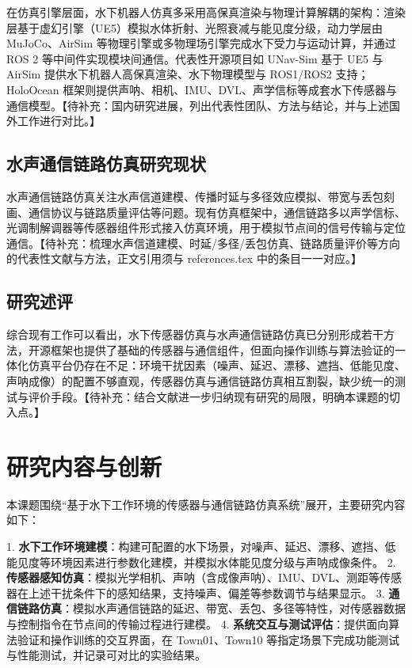 在仿真引擎层面，水下机器人仿真多采用高保真渲染与物理计算解耦的架构：渲染层基于虚幻引擎（UE5）模拟水体折射、光照衰减与能见度分级，动力学层由 MuJoCo、AirSim 等物理引擎或多物理场引擎完成水下受力与运动计算，并通过 ROS 2 等中间件实现模块间通信。代表性开源项目如 UNav-Sim 基于 UE5 与 AirSim 提供水下机器人高保真渲染、水下物理模型与 ROS1/ROS2 支持；HoloOcean 框架则提供声呐、相机、IMU、DVL、声学信标等成套水下传感器与通信模型\cite{ref3}。【待补充：国内研究进展，列出代表性团队、方法与结论，并与上述国外工作进行对比。】

\subsection{水声通信链路仿真研究现状}

水声通信链路仿真关注水声信道建模、传播时延与多径效应模拟、带宽与丢包刻画、通信协议与链路质量评估等问题。现有仿真框架中，通信链路多以声学信标、光调制解调器等传感器组件形式接入仿真环境，用于模拟节点间的信号传输与定位通信\cite{ref2}。【待补充：梳理水声信道建模、时延/多径/丢包仿真、链路质量评价等方向的代表性文献与方法，正文引用须与 references.tex 中的条目一一对应。】

\subsection{研究述评}

综合现有工作可以看出，水下传感器仿真与水声通信链路仿真已分别形成若干方法，开源框架也提供了基础的传感器与通信组件，但面向操作训练与算法验证的一体化仿真平台仍存在不足：环境干扰因素（噪声、延迟、漂移、遮挡、低能见度、声呐成像）的配置不够直观，传感器仿真与通信链路仿真相互割裂，缺少统一的测试与评价手段。【待补充：结合文献进一步归纳现有研究的局限，明确本课题的切入点。】

\section{研究内容与创新}

本课题围绕“基于水下工作环境的传感器与通信链路仿真系统”展开，主要研究内容如下：

1. \textbf{水下工作环境建模}：构建可配置的水下场景，对噪声、延迟、漂移、遮挡、低能见度等环境因素进行参数化建模，并模拟水体能见度分级与声呐成像条件。
2. \textbf{传感器感知仿真}：模拟光学相机、声呐（含成像声呐）、IMU、DVL、测距等传感器在上述干扰条件下的感知结果，支持噪声、偏差等参数调节与结果显示。
3. \textbf{通信链路仿真}：模拟水声通信链路的延迟、带宽、丢包、多径等特性，对传感器数据与控制指令在节点间的传输过程进行建模。
4. \textbf{系统交互与测试评估}：提供面向算法验证和操作训练的交互界面，在 Town01、Town10 等指定场景下完成功能测试与性能测试，并记录可对比的实验结果。

